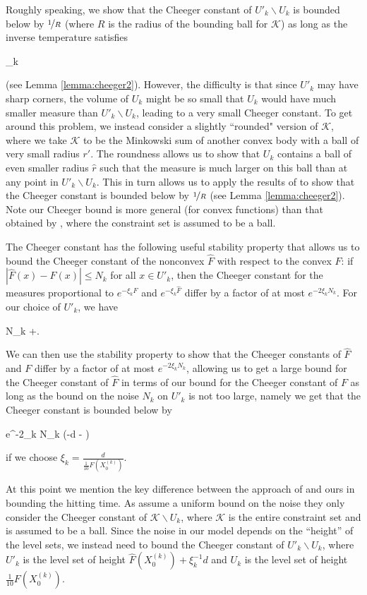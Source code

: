 \documentclass[final,12pt]{colt2018} %
\def \be{\begin{equs}}
\def \ee{\end{equs}}
\begin{document}
{%
Roughly speaking, we show that the Cheeger constant of $U'_k \backslash U_k$ is bounded below by $\nicefrac{1}{R}$ (where $R$ is the radius of the bounding ball for $\mathcal{K}$) as long as the inverse temperature satisfies 
\be 
\xi_k \geq {}
\ee (see Lemma \ref{lemma:cheeger2}).
%
However, the difficulty is that since $U'_k$ may have sharp corners, the volume of $U_k$ might be so small that $U_k$ would have much smaller measure than $U'_k \backslash U_k$, leading to a very small Cheeger constant.
%
To get around this problem, we instead consider a slightly ``rounded" version of $\mathcal{K}$, where we take $\mathcal{K}$ to be the Minkowski sum of another convex body with a ball of very small radius $r'$.
%
The roundness allows us to show that $U_k$ contains a ball of even smaller radius $\hat{r}$ such that the measure is much larger on this ball than at any point in  $U'_k\backslash U_k$. 
%
This in turn allows us to apply the results of \cite{lovasz1993random} to show that the Cheeger constant is bounded below by $\nicefrac{1}{R}$ (see Lemma \ref{lemma:cheeger2}).  
%
Note our Cheeger bound is more general   (for convex functions) than that obtained by \cite{hitting_times}, where the constraint set is assumed to be a ball.




%


 The Cheeger constant has the following useful stability property that allows us to bound the Cheeger constant of the nonconvex $\hat{F}$ with respect to the convex $F$: if $|\hat{F}(x) - F(x)| \leq N_k$ for all $x\in U'_k$, then the Cheeger constant for the measures proportional to $e^{-\xi_k F}$ and $e^{-\xi_k\hat{F}}$ differ by a factor of at most $e^{-2\xi_k N_k}$.
For our choice of $U'_k$, we have  
\be
N_k \approx \alpha[F(X^{(k)}_0) + \xi_k^{-1}d]+\beta.
\ee
% 
We can then use the stability property to show that the Cheeger constants of $\hat{F}$ and $F$ differ by a factor of at most $e^{-2\xi_k N_k}$, allowing us to get a large bound for the Cheeger constant of $\hat{F}$ in terms of our bound for the Cheeger constant of $F$ as long as the bound on the noise $N_k$ on $U'_k$ is not too large, namely we get that the Cheeger constant is bounded below by 
\be
{} e^{-2\xi_k N_k} \approx {} \exp\left(-\alpha d - \beta \right)
\ee
 if we choose $\xi_k = \frac{d}{\frac{1}{10}F(X^{(k)}_0)}$.



%
At this point we mention the key difference between the approach of  \cite{hitting_times}  and ours in bounding the hitting time.
%
As \cite{hitting_times} assume a uniform bound on the noise they only consider the Cheeger constant of $\mathcal{K}\backslash U_k$, where $\mathcal{K}$ is the entire constraint set and is assumed to be a ball.  
%
Since the noise in our model depends on the ``height'' of the level sets, we  instead need to bound the Cheeger constant of $U'_k\backslash U_k$,  where $U'_k$ is the level set of height $\hat{F}(X^{(k)}_0) + \xi_k^{-1}d$ and $U_k$ is the level set of height $\frac{1}{10}F(X^{(k)}_0)$.

}
\end{document}
